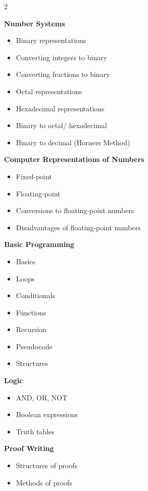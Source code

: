 \documentclass{article}
\begin{document}
\begin{multicols}{2}
    
\textbf{Number Systems}
\begin{itemize}
    \item Binary representations
    \item Converting integers to binary
    \item Converting fractions to binary
    \item Octal representations
    \item Hexadecimal representations
    \item Binary to octal/ hexadecimal
    \item Binary to decimal (Horners Method)
\end{itemize}

\textbf{Computer Representations of Numbers}
\begin{itemize}
    \item Fixed-point
    \item Floating-point
    \item Conversions to floating-point numbers
    \item Disadvantages of floating-point numbers
\end{itemize}

\textbf{Basic Programming}
\begin{itemize}
    \item Basics
    \item Loops
    \item Conditionals
    \item Functions
    \item Recursion
    \item Pseudocode
    \item Structures
\end{itemize}

\textbf{Logic}
\begin{itemize}
    \item AND, OR, NOT
    \item Boolean expressions
    \item Truth tables
\end{itemize}

\textbf{Proof Writing}
\begin{itemize}
    \item Structures of proofs
    \item Methods of proofs
\end{itemize}


\end{multicols}
\end{document}
